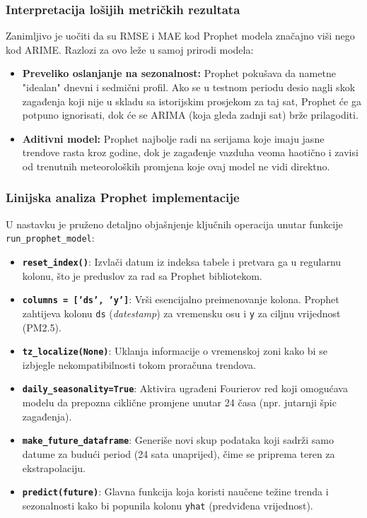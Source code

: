 \documentclass[12pt,a4paper]{article}
\begin{document}
	\subsubsection{Interpretacija lošijih metričkih rezultata}
	
	Zanimljivo je uočiti da su RMSE i MAE kod Prophet modela značajno viši nego kod ARIME. Razlozi za ovo leže u samoj prirodi modela:
	\begin{itemize}
		\item \textbf{Preveliko oslanjanje na sezonalnost:} Prophet pokušava da nametne "idealan" dnevni i sedmični profil. Ako se u testnom periodu desio nagli skok zagađenja koji nije u skladu sa istorijskim prosjekom za taj sat, Prophet će ga potpuno ignorisati, dok će se ARIMA (koja gleda zadnji sat) brže prilagoditi.
		\item \textbf{Aditivni model:} Prophet najbolje radi na serijama koje imaju jasne trendove rasta kroz godine, dok je zagađenje vazduha veoma haotično i zavisi od trenutnih meteoroloških promjena koje ovaj model ne vidi direktno.
	\end{itemize}
	
	\subsubsection{Linijska analiza Prophet implementacije}
	
	U nastavku je pruženo detaljno objašnjenje ključnih operacija unutar funkcije \texttt{run\_prophet\_model}:
	
	\begin{itemize}
		\item \textbf{\texttt{reset\_index()}}: Izvlači datum iz indeksa tabele i pretvara ga u regularnu kolonu, što je preduslov za rad sa Prophet bibliotekom.
		\item \textbf{\texttt{columns = ['ds', 'y']}}: Vrši esencijalno preimenovanje kolona. Prophet zahtijeva kolonu \texttt{ds} (\textit{datestamp}) za vremensku osu i \texttt{y} za ciljnu vrijednost (PM2.5).
		\item \textbf{\texttt{tz\_localize(None)}}: Uklanja informacije o vremenskoj zoni kako bi se izbjegle nekompatibilnosti tokom proračuna trendova.
		\item \textbf{\texttt{daily\_seasonality=True}}: Aktivira ugrađeni Fourierov red koji omogućava modelu da prepozna ciklične promjene unutar 24 časa (npr. jutarnji špic zagađenja).
		\item \textbf{\texttt{make\_future\_dataframe}}: Generiše novi skup podataka koji sadrži samo datume za budući period (24 sata unaprijed), čime se priprema teren za ekstrapolaciju.
		\item \textbf{\texttt{predict(future)}}: Glavna funkcija koja koristi naučene težine trenda i sezonalnosti kako bi popunila kolonu \texttt{yhat} (predviđena vrijednost).
	\end{itemize}
	
\end{document}
